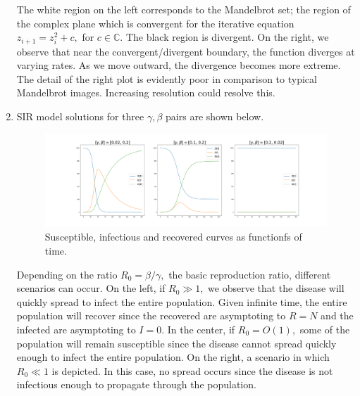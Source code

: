 \documentclass{article}
\begin{document}
\begin{enumerate}
The white region on the left corresponds to the Mandelbrot set; the region of the complex plane which is convergent for the iterative equation $z_{i+1}=z_i^2+c,$ for $c\in\mathbb{C}.$ The black region is divergent. On the right, we observe that near the convergent/divergent boundary, the function diverges at varying rates. As we move outward, the divergence becomes more extreme. The detail of the right plot is evidently poor in comparison to typical Mandelbrot images. Increasing resolution could resolve this.

\newpage

\item SIR model solutions for three $\gamma,\beta$ pairs are shown below.
\begin{figure}[htb!]
    \centering
    \includegraphics[scale=0.23]{SIR.png}
    \caption{Susceptible, infectious and recovered curves as functionfs of time.}
    \label{fig:my_label}
\end{figure}
Depending on the ratio $R_0=\beta/\gamma,$ the basic reproduction ratio, different scenarios can occur. On the left, if $R_0\gg1,$ we observe that the disease will quickly spread to infect the entire population. Given infinite time, the entire population will recover since the recovered are asymptoting to $R=N$ and the infected are asymptoting to $I=0.$ In the center, if $R_0=O(1),$ some of the population will remain susceptible since the disease cannot spread quickly enough to infect the entire population. On the right, a scenario in which $R_0\ll 1$ is depicted. In this case, no spread occurs since the disease is not infectious enough to propagate through the population.
    
\end{enumerate}
\end{document}

